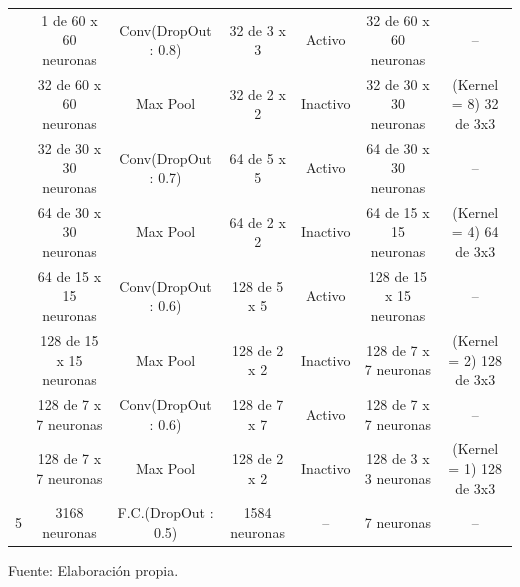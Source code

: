 {\begin{enumerate}
\begin{table}[H]
\begin{center}
\begin{tabular}{|>{\tiny}c|>{\tiny}c>{\tiny}c>{\tiny}c>{\tiny}c>{\tiny}c|>{\tiny}c|}
		 & 1 de 60 x 60 neuronas & Conv(DropOut : 0.8) & 32 de 3 x 3 & Activo & 32 de 60 x 60 neuronas & --\\ 
		\multirow{-2}{*}{1} &  32 de 60 x 60 neuronas &  Max Pool &  32 de 2 x 2 &  Inactivo & 32 de 30 x 30 neuronas & {\cellcolor[HTML]{DAE8FC}(Kernel = 8) 32 de 3x3}\\ \hline
		 & 32 de 30 x 30 neuronas & Conv(DropOut : 0.7) & 64 de 5 x 5 & Activo & 64 de 30 x 30 neuronas & --\\ 
		\multirow{-2}{*}{2} &  64 de 30 x 30 neuronas &  Max Pool &  64 de 2 x 2 &  Inactivo & 64 de 15 x 15 neuronas & {\cellcolor[HTML]{DAE8FC}(Kernel = 4) 64 de 3x3}\\ \hline			
		 & 64 de 15 x 15 neuronas & Conv(DropOut : 0.6) & 128 de 5 x 5 & Activo & 128 de 15 x 15 neuronas & --\\ 			
		\multirow{-2}{*}{3} &  128 de 15 x 15 neuronas &  Max Pool &  128 de 2 x 2 &  Inactivo & 128 de 7 x 7 neuronas & {\cellcolor[HTML]{DAE8FC} (Kernel = 2) 128 de 3x3 }\\ \hline
		{\cellcolor[HTML]{ffb3b3}}& 128 de 7 x 7 neuronas & Conv(DropOut : 0.6) & 128 de 7 x 7 & Activo & 128 de 7 x 7 neuronas & --\\ 			
		{\cellcolor[HTML]{ffb3b3}\multirow{-2}{*}{4}} &  128 de 7 x 7 neuronas &  Max Pool &  128 de 2 x 2 &  Inactivo & 128 de 3 x 3 neuronas & {\cellcolor[HTML]{DAE8FC} (Kernel = 1) 128 de 3x3 }\\ \hline
		5 &  {\cellcolor[HTML]{DAE8FC}3168 neuronas} &  F.C.(DropOut : 0.5) &  1584 neuronas &  -- & 7 neuronas & --\\ \hline
		\end{tabular}
		\end{center}
		\begin{center}
		\vskip 0.2cm
		{\small{Fuente: Elaboración propia.}}
		\end{center}
		\end{table}
	\end{enumerate}
}


